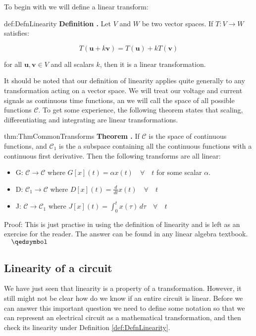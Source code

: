 \documentclass[14pt,a5paper,twoside]{book}
\newenvironment{myTheorem}[2]{ \begin{Theorem}[adjusted title=#1]{}{#2} 
  \textbf{Theorem \thetcbcounter.} \label{#2}}{\end{Theorem}}
\newenvironment{myDefinition}[2]{ \begin{Definition}[adjusted title=#1]{}{#2} 
  \textbf{Definition \thetcbcounter.} \label{#2}}{\end{Definition}}
\begin{document}
To begin with we will define a linear transform:

\begin{myDefinition}{Linearity}{def:DefnLinearity}
	Let $V$ and $W$ be two vector spaces. If $T:V\to W$ satisfies:

$$ T(\mathbf{u}+k\mathbf{v}) = T(\mathbf{u}) +kT(\mathbf{v})$$

for all $\mathbf{u},\mathbf{v}\in V$ and all scalars $k$, then it is a linear transformation.
\end{myDefinition}

It should be noted that our definition of linearity applies quite generally to any transformation acting on a vector space. We will treat our voltage and current signals as continuous time functions, an we will call the space of all possible functions $\mathcal{C}$. To get some experience, the following theorem states that scaling, differentiating and integrating are linear transformations.

\begin{myTheorem}{Common linear transforms}{thm:ThmCommonTransforms}
	If $\mathcal{C}$ is the space of continuous functions, and $\mathcal{C}_1$ is the a subspace containing all the continuous functions with a continuous first derivative. Then the following transforms are all linear:
	
	\begin{itemize}
	\item{G: $\mathcal{C}\to\mathcal{C}$ where $G[x] (t) = \alpha x(t)\quad\forall\quad t$ for some scalar $\alpha$.}
	\item{D: $\mathcal{C}_1\to\mathcal{C}$ where $D[x] (t) = \frac{d}{dt}x(t)\quad\forall\quad t$}
	\item{J: $\mathcal{C}\to\mathcal{C}_1$ where $J[x] (t) = \int_0^t x(\tau) \,d\tau\quad\forall\quad t$}
	\end{itemize}
\end{myTheorem}

Proof: This is just practise in using the definition of linearity and is left as an exercise for the reader. The answer can be found in any linear algebra textbook. $\quad\qedsymbol$

\subsection{Linearity of a circuit}

We have just seen that linearity is a property of a transformation. However, it still might not be clear how do we know if an entire circuit is linear. Before we can answer this important question we need to define some notation so that we can represent an electrical circuit as a mathematical transformation, and then check its linearity under Definition \ref{def:DefnLinearity}.
\end{document}
